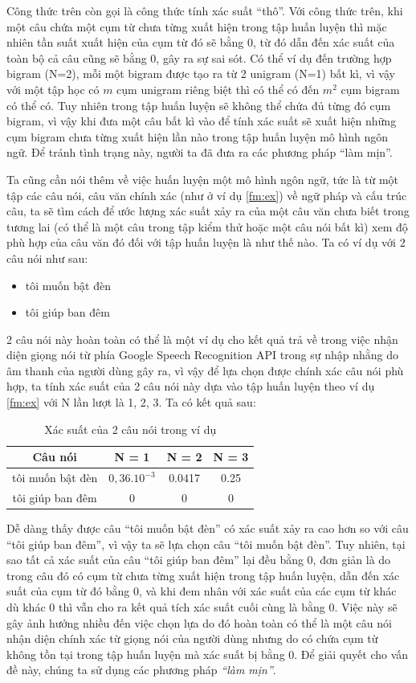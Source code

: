 \documentclass[12pt]{report}
\begin{document}
Công thức trên còn gọi là công thức tính xác suất ``thô''. Với công thức trên, khi một câu chứa một cụm từ chưa từng xuất hiện trong tập huấn luyện thì mặc nhiên tần suất xuất hiện của cụm từ đó sẽ bằng 0, từ đó dẫn đến xác suất của toàn bộ cả câu cũng sẽ bằng 0, gây ra sự sai sót. Có thể ví dụ đến trường hợp bigram (N=2), mỗi một bigram được tạo ra từ 2 unigram (N=1) bất kì, vì vậy với một tập học có $m$ cụm unigram riêng biệt thì có thể có đến $m^2$ cụm bigram có thể có. Tuy nhiên trong tập huấn luyện sẽ không thể chứa đủ từng đó cụm bigram, vì vậy khi đưa một câu bất kì vào để tính xác suất sẽ xuất hiện những cụm bigram chưa từng xuất hiện lần nào trong tập huấn luyện mô hình ngôn ngữ. Để tránh tình trạng này, người ta đã đưa ra các phương pháp ``làm mịn''.

Ta cũng cần nói thêm về việc huấn luyện một mô hình ngôn ngữ, tức là từ một tập các câu nói, câu văn chính xác (như ở ví dụ \ref{fm:ex}) về ngữ pháp và cấu trúc câu, ta sẽ tìm cách để ước lượng xác suất xảy ra của một câu văn chưa biết trong tương lai (có thể là một câu trong tập kiểm thử hoặc một câu nói bất kì) xem độ phù hợp của câu văn đó đối với tập huấn luyện là như thế nào. Ta có ví dụ với 2 câu nói như sau:

\begin{itemize}
 	\item tôi muốn bật đèn
 	\item tôi giúp ban đêm
 \end{itemize} 

2 câu nói này hoàn toàn có thể là một ví dụ cho kết quả trả về trong việc nhận diện giọng nói từ phía Google Speech Recognition API trong sự nhập nhằng do âm thanh của người dùng gây ra, vì vậy để lựa chọn được chính xác câu nói phù hợp, ta tính xác suất của 2 câu nói này dựa vào tập huấn luyện theo ví dụ \ref{fm:ex} với N lần lượt là 1, 2, 3. Ta có kết quả sau:

\begin{table}[h]
	\caption{Xác suất của 2 câu nói trong ví dụ}
	\centering
	\begin{tabular}{ | c | C | C | C | }
	\hline
	Câu nói & N = 1 & N = 2 & N = 3 \\
	\hline
	tôi muốn bật đèn & $0,36.10^{-3}$ & 0.0417 & 0.25  \\
	\hline
	tôi giúp ban đêm & 0 & 0 & 0  \\
	\hline
	\end{tabular}
\end{table}

Dễ dàng thấy được câu ``tôi muốn bật đèn'' có xác suất xảy ra cao hơn so với câu ``tôi giúp ban đêm'', vì vậy ta sẽ lựa chọn câu ``tôi muốn bật đèn''. Tuy nhiên, tại sao tất cả xác suất của câu ``tôi giúp ban đêm'' lại đều bằng 0, đơn giản là do trong câu đó có cụm từ chưa từng xuất hiện trong tập huấn luyện, dẫn đến xác suất của cụm từ đó bằng 0, và khi đem nhân với xác suất của các cụm từ khác dù khác 0 thì vẫn cho ra kết quả tích xác suất cuối cùng là bằng 0. Việc này sẽ gây ảnh hưởng nhiều đến việc chọn lựa do đó hoàn toàn có thể là một câu nói nhận diện chính xác từ giọng nói của người dùng nhưng do có chứa cụm từ không tồn tại trong tập huấn luyện mà xác suất bị bằng 0. Để giải quyết cho vấn đề này, chúng ta sử dụng các phương pháp \textit{``làm mịn''}.
\end{document}
